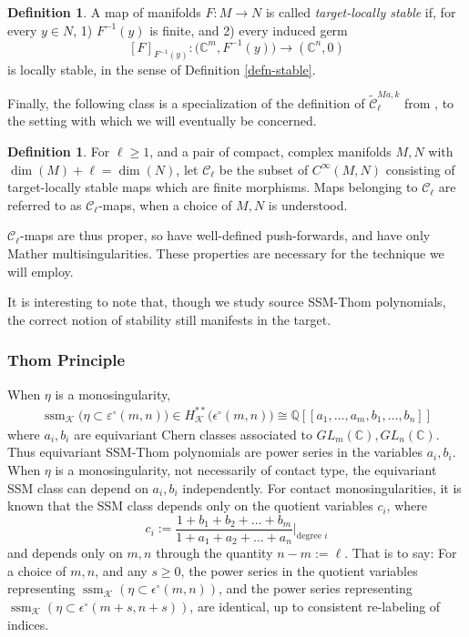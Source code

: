 \documentclass[11pt]{article}
\theoremstyle{plain}
\theoremstyle{definition}
\newtheorem{definition}[fact]{Definition}
\theoremstyle{definition}
\newcommand{\C}{\mathbb{C}}
\DeclareMathOperator{\ssm}{ssm}
\begin{document}
\begin{definition}
    A map of manifolds $F: M\to N$ is called \textit{target-locally stable} if, for every $y \in N$, 1) $F^{-1}(y)$ is finite, and 2) every induced germ
    \[
    [F]_{F^{-1}(y)}: \big(\C^m,F^{-1}(y)\big) \to (\C^n,0)
    \]
    is locally stable, in the sense of Definition \ref{defn-stable}. 
\end{definition}

Finally, the following class is a specialization of the definition of $\tilde{\mathcal C}^{Ma,k}_\ell$ from \cite{rimanyi}, to the setting with which we will eventually be concerned.

\begin{definition}
    For $\ell\geq 1$, and a pair of compact, complex manifolds $M,N$ with $\dim(M)+ \ell=\dim(N)$, let $\mathcal C_\ell$ be the subset of $C^\infty(M,N)$ consisting of target-locally stable maps which are finite morphisms. Maps belonging to $\mathcal C_\ell$ are referred to as $\mathcal C_\ell$-maps, when a choice of $M,N$ is understood. 
\end{definition}

$\mathcal C_\ell$-maps are thus proper, so have well-defined push-forwards, and have only Mather multisingularities. These properties are necessary for the technique we will employ. 

It is interesting to note that, though we study source SSM-Thom polynomials, the correct notion of stability still manifests in the target. 

\subsubsection{Thom Principle}
When $\eta$ is a monosingularity, 
\begin{align*}
\ssm_{\mathcal K}\big(\eta\subset\varepsilon^\circ(m,n)\big)\in H_{\mathcal K}^{**}\big(\epsilon^\circ(m,n)\big)\cong \mathbb{Q}[[a_1,\dots,a_m,b_1,\dots,b_n]]
\end{align*}
where $a_i,b_i$ are equivariant Chern classes associated to $GL_m(\C),GL_n(\C)$. Thus equivariant SSM-Thom polynomials are power series in the variables $a_i,b_i$. When $\eta$ is a monosingularity, not necessarily of contact type, the equivariant SSM class can depend on $a_i,b_i$ independently. For contact monosingularities, it is known that the SSM class depends only on the quotient variables $c_i$, where
$$
c_i:=\frac{1+b_1+b_2+\dots+b_m}{1+a_1+a_2+\dots+a_n}\Bigg|_{\text{degree }i}
$$
and depends only on $m,n$ through the quantity $n-m:=\ell$. That is to say: For a choice of $m,n$, and any $s\geq 0$, the power series in the quotient variables representing $\ssm_{\mathcal K}(\eta\subset\epsilon^\circ(m,n))$, and the power series representing $\ssm_{\mathcal K}(\eta\subset\epsilon^\circ(m+s,n+s))$, are identical, up to consistent re-labeling of indices.
\end{document}
